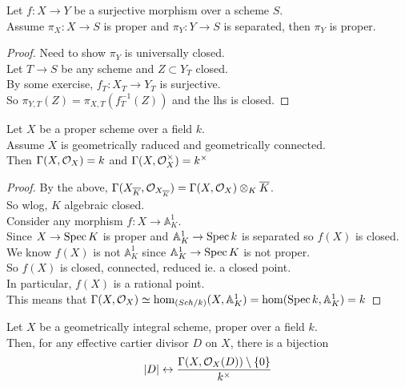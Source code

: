 \documentclass[../main.tex]{subfiles}
\begin{document}
\begin{lemma}
Let $f:X\to Y$ be a surjective morphism  over a scheme $S$.\\
Assume $\pi_X: X\to S$ is proper and $\pi_Y:Y \to S$ is separated, then $\pi_Y$ is proper.
\end{lemma}
\begin{proof}
Need to show $\pi_Y$ is universally closed.\\
Let $T\to S$ be any scheme and $Z \subset Y_T$ closed.\\
By some exercise, $f_T: X_T\to Y_T$ is surjective.\\
So $\pi_{Y,T} ( Z) = \pi_{X,T} ( f_T^{-1}( Z) ) $ and the lhs is closed.
\end{proof}
\begin{propo}
Let $X$ be a proper scheme over a field $k$.\\
Assume $X$ is geometrically raduced and geometrically connected.\\
Then $\Gamma( X,\mathcal{O}_X) = k$ and $\Gamma( X, \mathcal{O}_X^{\times}) = k^{\times}$ 
\end{propo}
\begin{proof}
By the above, $\Gamma( X_{\overline{K}} , \mathcal{O}_{X_{\overline{K}} } ) = \Gamma( X,\mathcal{O}_X) \otimes_K \overline{K}$.\\
So wlog, $K$ algebraic closed.\\
Consider any morphism $f:X\to \mathbb{A}^{1}_K$.\\
Since $X\to \operatorname{Spec} K$ is proper and $\mathbb{A}^{1}_K \to \operatorname{Spec} k$ is separated so $f( X) $ is closed.\\
We know $f( X) $ is not $\mathbb{A}^{1}_K$ since $ \mathbb{A}^{1}_K \to \operatorname{Spec} K$ is not proper.\\
So $f( X) $ is closed, connected, reduced ie. a closed point.\\
In particular, $f( X) $ is a rational point.\\
This means that $\Gamma( X,\mathcal{O}_X) \simeq \hom_{ ( Sch /k) } ( X, \mathbb{A}^{1}_K) = \hom( \operatorname{Spec} k , \mathbb{A}^{1}_K) = k$ 
\end{proof}
\begin{crly}
Let $X$ be a geometrically integral scheme, proper over a field $k$.\\
Then, for any effective cartier divisor  $D$ on $X$, there is a bijection
\[ 
|D| \leftrightarrow \frac{\Gamma( X,\mathcal{O}_X( D) ) \setminus \left\{ 0 \right\} }{k^{\times}}
\]

\end{crly}
\end{document}
